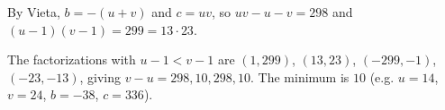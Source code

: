By Vieta, $b=-(u+v)$ and $c=uv$, so $uv-u-v=298$ and $(u-1)(v-1)=299=13\cdot23$.

The factorizations with $u-1<v-1$ are $(1,299)$, $(13,23)$, $(-299,-1)$, $(-23,-13)$, giving $v-u=298,10,298,10$. The minimum is $\boxed{10}$ (e.g. $u=14$, $v=24$, $b=-38$, $c=336$).
